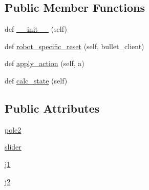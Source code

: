 \subsection*{Public Member Functions}
\begin{DoxyCompactItemize}
\item 
def \hyperlink{classpybullet-gym_1_1pybulletgym_1_1envs_1_1mujoco_1_1robots_1_1pendula_1_1inverted__double__penb7cabeef1e6b20f22de17739c38bbed3_a8be97cd8df4d5f597cb95608dec1a381}{\+\_\+\+\_\+init\+\_\+\+\_\+} (self)
\item 
def \hyperlink{classpybullet-gym_1_1pybulletgym_1_1envs_1_1mujoco_1_1robots_1_1pendula_1_1inverted__double__penb7cabeef1e6b20f22de17739c38bbed3_ad134f971825f99f6312ab00fabb18aef}{robot\+\_\+specific\+\_\+reset} (self, bullet\+\_\+client)
\item 
def \hyperlink{classpybullet-gym_1_1pybulletgym_1_1envs_1_1mujoco_1_1robots_1_1pendula_1_1inverted__double__penb7cabeef1e6b20f22de17739c38bbed3_abc376b746e2e2a2dea183f8ef1cb7b87}{apply\+\_\+action} (self, a)
\item 
def \hyperlink{classpybullet-gym_1_1pybulletgym_1_1envs_1_1mujoco_1_1robots_1_1pendula_1_1inverted__double__penb7cabeef1e6b20f22de17739c38bbed3_aaa47b73065a92ce21af8e55c67063a42}{calc\+\_\+state} (self)
\end{DoxyCompactItemize}
\subsection*{Public Attributes}
\begin{DoxyCompactItemize}
\item 
\hyperlink{classpybullet-gym_1_1pybulletgym_1_1envs_1_1mujoco_1_1robots_1_1pendula_1_1inverted__double__penb7cabeef1e6b20f22de17739c38bbed3_a4034e0beb3e770af8b04134c301f1892}{pole2}
\item 
\hyperlink{classpybullet-gym_1_1pybulletgym_1_1envs_1_1mujoco_1_1robots_1_1pendula_1_1inverted__double__penb7cabeef1e6b20f22de17739c38bbed3_a0418c60ebbb12df4d363b3c5f4d933e7}{slider}
\item 
\hyperlink{classpybullet-gym_1_1pybulletgym_1_1envs_1_1mujoco_1_1robots_1_1pendula_1_1inverted__double__penb7cabeef1e6b20f22de17739c38bbed3_a997307d58e17c840133df8929988f0ba}{j1}
\item 
\hyperlink{classpybullet-gym_1_1pybulletgym_1_1envs_1_1mujoco_1_1robots_1_1pendula_1_1inverted__double__penb7cabeef1e6b20f22de17739c38bbed3_a320a8a2f78e3a9b4ec341839c162b36e}{j2}
\end{DoxyCompactItemize}


